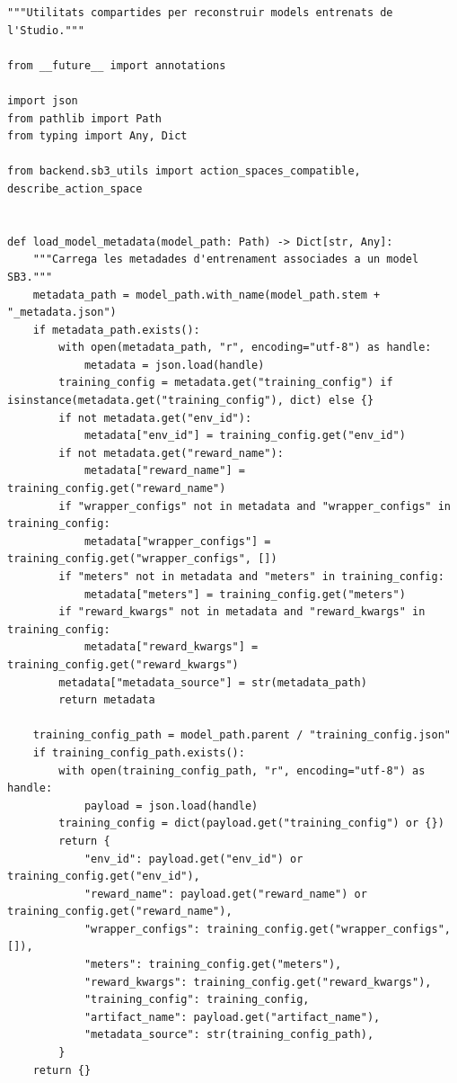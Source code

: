 \documentclass[10pt,a4paper]{article}
\begin{document}
\begin{lstlisting}[style=studioPython,caption={backend/model\_metadata.py},label={lst:backend-model-metadata-py}]
"""Utilitats compartides per reconstruir models entrenats de l'Studio."""

from __future__ import annotations

import json
from pathlib import Path
from typing import Any, Dict

from backend.sb3_utils import action_spaces_compatible, describe_action_space


def load_model_metadata(model_path: Path) -> Dict[str, Any]:
    """Carrega les metadades d'entrenament associades a un model SB3."""
    metadata_path = model_path.with_name(model_path.stem + "_metadata.json")
    if metadata_path.exists():
        with open(metadata_path, "r", encoding="utf-8") as handle:
            metadata = json.load(handle)
        training_config = metadata.get("training_config") if isinstance(metadata.get("training_config"), dict) else {}
        if not metadata.get("env_id"):
            metadata["env_id"] = training_config.get("env_id")
        if not metadata.get("reward_name"):
            metadata["reward_name"] = training_config.get("reward_name")
        if "wrapper_configs" not in metadata and "wrapper_configs" in training_config:
            metadata["wrapper_configs"] = training_config.get("wrapper_configs", [])
        if "meters" not in metadata and "meters" in training_config:
            metadata["meters"] = training_config.get("meters")
        if "reward_kwargs" not in metadata and "reward_kwargs" in training_config:
            metadata["reward_kwargs"] = training_config.get("reward_kwargs")
        metadata["metadata_source"] = str(metadata_path)
        return metadata

    training_config_path = model_path.parent / "training_config.json"
    if training_config_path.exists():
        with open(training_config_path, "r", encoding="utf-8") as handle:
            payload = json.load(handle)
        training_config = dict(payload.get("training_config") or {})
        return {
            "env_id": payload.get("env_id") or training_config.get("env_id"),
            "reward_name": payload.get("reward_name") or training_config.get("reward_name"),
            "wrapper_configs": training_config.get("wrapper_configs", []),
            "meters": training_config.get("meters"),
            "reward_kwargs": training_config.get("reward_kwargs"),
            "training_config": training_config,
            "artifact_name": payload.get("artifact_name"),
            "metadata_source": str(training_config_path),
        }
    return {}



\end{lstlisting}
\end{document}
